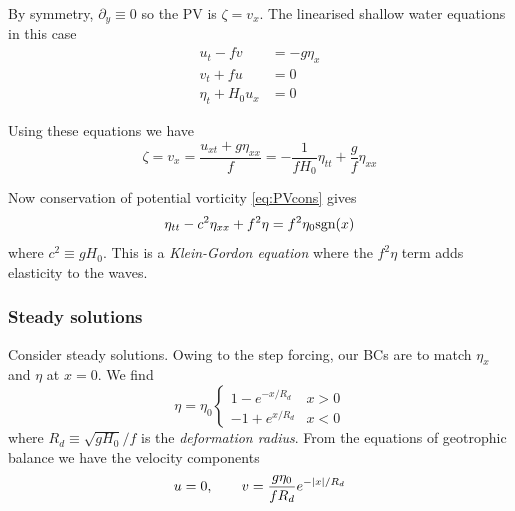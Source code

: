 \documentclass{jknotes}
\begin{document}
By symmetry, $\partial_y \equiv 0$ so the PV is $\zeta = v_x$. The linearised
shallow water equations in this case
\begin{align}
	u_t - fv &= -g\eta_x \\
	v_t + fu &= 0 \\
	\eta_t + H_0 u_x &= 0
\end{align}

Using these equations we have
\begin{equation}
	\zeta = v_x = \frac{u_{xt} + g\eta_{xx}}{f} = -\frac{1}{f H_0} \eta_{tt} +
	\frac{g}{f}\eta_{xx}
\end{equation}

Now conservation of potential vorticity \eqref{eq:PVcons} gives
\begin{equation}
	\eta_{tt} - c^2 \eta_{xx} + f^2 \eta = f^2 \eta_0 \text{sgn}(x)
\end{equation}
where $c^2 \equiv g H_0$. This is a \emph{Klein-Gordon equation} where the
$f^2\eta$ term adds elasticity to the waves.

\subsubsection{Steady solutions}
Consider steady solutions. Owing to the step forcing, our BCs are to match
$\eta_x$ and $\eta$ at $x=0$. We find
\begin{equation}
	\eta = \eta_0 \begin{cases} 1 - e^{-x/R_d} & x > 0 \\ -1 + e^{x/R_d} & x <
	0 \end{cases} \label{eq:gasoln}
\end{equation}
where $R_d \equiv \sqrt{gH_0}/f$ is the \emph{deformation radius}. From the
equations of geotrophic balance we have the velocity components
\begin{equation}
	u = 0, \hspace{2em} v = \frac{g \eta_0}{fR_d} e^{-\abs{x}/R_d}
\end{equation}
\begin{center}
\end{center}
\end{document}

